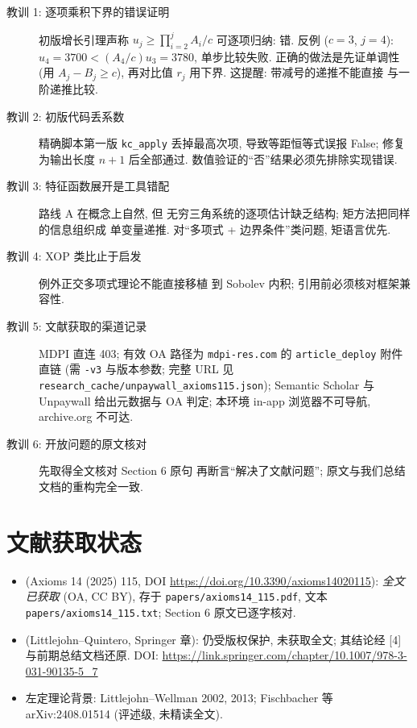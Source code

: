 \documentclass[UTF8]{ctexart}
\begin{document}
\begin{description}
	\item[教训 1: 逐项乘积下界的错误证明] 初版增长引理声称
		$u_j \geq \prod_{i=2}^j A_i/c$ 可逐项归纳: 错. 反例
		($c = 3$, $j = 4$): $u_4 = 3700 < (A_4/c)u_3 = 3780$,
		单步比较失败. 正确的做法是先证单调性 (用 $A_j - B_j \geq c$),
		再对比值 $r_j$ 用下界. 这提醒: 带减号的递推不能直接
		与一阶递推比较.
	\item[教训 2: 初版代码丢系数] 精确脚本第一版 \texttt{kc\_apply}
		丢掉最高次项, 导致等距恒等式误报 False; 修复为输出长度
		$n+1$ 后全部通过. 数值验证的``否''结果必须先排除实现错误.
	\item[教训 3: 特征函数展开是工具错配] 路线 A 在概念上自然, 但
		无穷三角系统的逐项估计缺乏结构; 矩方法把同样的信息组织成
		单变量递推. 对``多项式 + 边界条件''类问题, 矩语言优先.
	\item[教训 4: XOP 类比止于启发] 例外正交多项式理论不能直接移植
		到 Sobolev 内积; 引用前必须核对框架兼容性.
	\item[教训 5: 文献获取的渠道记录] MDPI 直连 403; 有效 OA 路径为
		\texttt{mdpi-res.com} 的 \texttt{article\_deploy} 附件直链
		(需 \texttt{-v3} 与版本参数; 完整 URL 见
		\texttt{research\_cache/unpaywall\_axioms115.json}); Semantic Scholar
		与 Unpaywall 给出元数据与 OA 判定; 本环境 in-app 浏览器不可导航,
		archive.org 不可达.
	\item[教训 6: 开放问题的原文核对] 先取得全文核对 Section 6 原句
		再断言``解决了文献问题''; 原文与我们总结文档的重构完全一致.
\end{description}

\section{文献获取状态}

\begin{itemize}
	\item [4] (Axioms 14 (2025) 115, DOI \url{https://doi.org/10.3390/axioms14020115}):
		\emph{全文已获取} (OA, CC BY), 存于 \texttt{papers/axioms14\_115.pdf},
		文本 \texttt{papers/axioms14\_115.txt}; Section 6 原文已逐字核对.
	\item [1] (Littlejohn--Quintero, Springer 章): 仍受版权保护, 未获取全文;
		其结论经 [4] 与前期总结文档还原. DOI:
		\url{https://link.springer.com/chapter/10.1007/978-3-031-90135-5_7}
	\item 左定理论背景: Littlejohn--Wellman 2002, 2013; Fischbacher 等
		arXiv:2408.01514 (评述级, 未精读全文).
\end{itemize}
\end{document}
